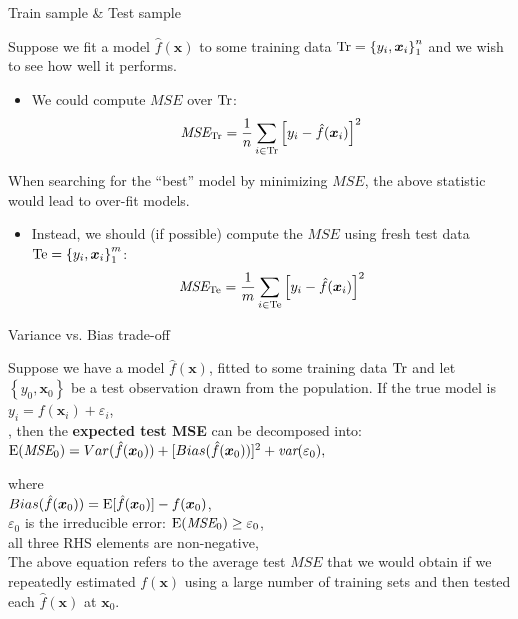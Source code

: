 \documentclass{beamer}
\begin{document}
\begin{frame}{Train sample \& Test sample}

Suppose we fit a model $\hat{f}(\bm{x})$ to some training data $\textnormal{Tr}=\left\lbrace y_i, \bm{x}_i \right\rbrace _1 ^n$ and we wish to see how well it performs.

\begin{itemize}
\item We could compute $\textit{MSE}$ over $\textnormal{Tr}$:
$$ \textit{MSE}_{\textnormal{Tr}} = \frac{1}{n}
   \sum_{i \in \textnormal{Tr}}
   \left[y_i - \hat{f}(\bm{x}_i) \right]^2 $$
\end{itemize}

When searching for the ``best'' model by minimizing $ \textit{MSE}$, the above statistic would lead to over-fit models.
\vspace{0.3 cm}
\begin{itemize}
\item Instead, we should (if possible) compute the $ \textit{MSE}$ using fresh test
data $\textnormal{Te}=\left\lbrace y_i, \bm{x}_i \right\rbrace _1 ^m$:
$$ \textit{MSE}_{\textnormal{Te}} = \frac{1}{m}
    \sum_{i \in \textnormal{Te}}
   \left[y_i - \hat{f}(\bm{x}_i) \right]^2 $$
\end{itemize}
\end{frame}
\begin{frame}{Variance vs. Bias trade-off}

Suppose we have a model $\hat{f}(\bm{x})$, fitted to some training data $\textnormal{Tr}$ and let $\left\lbrace y_0, \bm{x}_0 \right\rbrace$ be a test observation drawn from the population. If the true model is $y_i = f(\bm{x}_i) + \varepsilon_i$, \\[with $f(\bm{x}_i)= \textnormal{E}(y_i | \bm{x}_i )$],
then the \textbf{expected test MSE} can be decomposed into:\\
\medskip
$\textnormal{E}(\textit{MSE}_0)
   = Var(\hat{f}(\bm{x}_0))
   + [Bias(\hat{f}(\bm{x}_0))]^2
   + \textit{var}(\varepsilon_0),$

where\\
\smallskip
$Bias(\hat{f}(\bm{x}_0)) 
       = \textnormal{E}[\hat{f}(\bm{x}_0)]
       - f(\bm{x}_0)$,\\
$\varepsilon_0$ is the irreducible error: $\textnormal{E}(\textit{MSE}_0) \geq \varepsilon_0$,\\ 
all three RHS elements are non-negative,
\smallskip
\\The above equation refers to the average test $\textit{MSE}$ that we would obtain if we repeatedly estimated $f(\bm{x})$ using a large number of training sets and then tested each $\hat{f}(\bm{x})$ at $\bm{x}_0$.
\end{frame}
\end{document}
